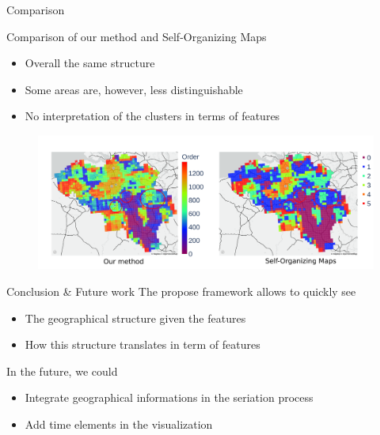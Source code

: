 \documentclass[10pt]{beamer}
\begin{document}
\begin{frame}{Comparison}

    Comparison of our method and Self-Organizing Maps
    \begin{itemize}
        \item Overall the same structure
        \item Some areas are, however, less distinguishable
        \item No interpretation of the clusters in terms of features
    \end{itemize}
    \begin{figure}
        \centering
        \includegraphics[scale=0.22]{figures/comparison.pdf}
    \end{figure}

\end{frame}

\begin{frame}{Conclusion \& Future work}
    The propose framework allows to quickly see
    \begin{itemize}
        \item The geographical structure given the features
        \item How this structure translates in term of features
    \end{itemize}
    \pause

    In the future, we could
    \begin{itemize}
        \item Integrate geographical informations in the seriation process
        \item Add time elements in the visualization
    \end{itemize}

\end{frame}
\end{document}
